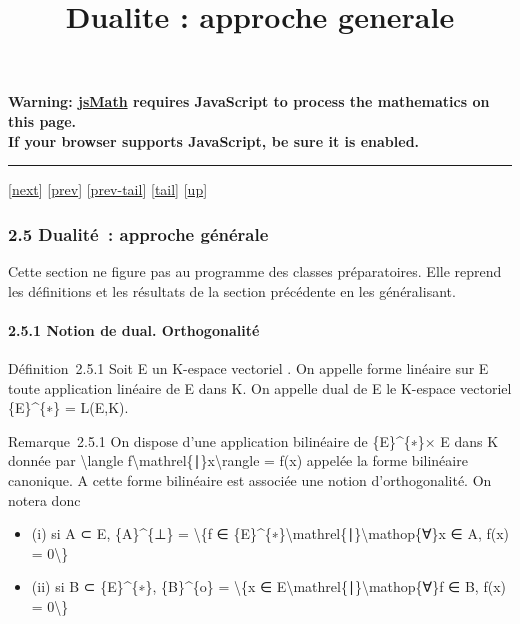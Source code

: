 \documentclass[]{article}
\title{Dualite : approche generale}
\author{}
\date{}
\begin{document}
\maketitle

\textbf{Warning: \href{http://www.math.union.edu/locate/jsMath}{jsMath}
requires JavaScript to process the mathematics on this page.\\ If your
browser supports JavaScript, be sure it is enabled.}

\begin{center}\rule{3in}{0.4pt}\end{center}

{[}\href{coursse12.html}{next}{]} {[}\href{coursse10.html}{prev}{]}
{[}\href{coursse10.html\#tailcoursse10.html}{prev-tail}{]}
{[}\hyperref[tailcoursse11.html]{tail}{]}
{[}\href{coursch3.html\#coursse11.html}{up}{]}

\subsubsection{2.5 Dualité~: approche générale}

Cette section ne figure pas au programme des classes préparatoires. Elle
reprend les définitions et les résultats de la section précédente en les
généralisant.

\paragraph{2.5.1 Notion de dual. Orthogonalité}

Définition~2.5.1 Soit E un K-espace vectoriel . On appelle forme
linéaire sur E toute application linéaire de E dans K. On appelle dual
de E le K-espace vectoriel \{E\}\^{}\{∗\} = L(E,K).

Remarque~2.5.1 On dispose d'une application bilinéaire de
\{E\}\^{}\{∗\}× E dans K donnée par \textbackslash{}langle
f\textbackslash{}mathrel\{∣\}x\textbackslash{}rangle = f(x) appelée la
forme bilinéaire canonique. A cette forme bilinéaire est associée une
notion d'orthogonalité. On notera donc

\begin{itemize}
\itemsep1pt\parskip0pt
\item
  (i) si A ⊂ E, \{A\}\^{}\{⊥\} = \textbackslash{}\{f ∈
  \{E\}\^{}\{∗\}\textbackslash{}mathrel\{∣\}\textbackslash{}mathop\{∀\}x
  ∈ A, f(x) = 0\textbackslash{}\}
\item
  (ii) si B ⊂ \{E\}\^{}\{∗\}, \{B\}\^{}\{o\} = \textbackslash{}\{x ∈
  E\textbackslash{}mathrel\{∣\}\textbackslash{}mathop\{∀\}f ∈ B, f(x) =
  0\textbackslash{}\}
\end{itemize}
\end{document}
